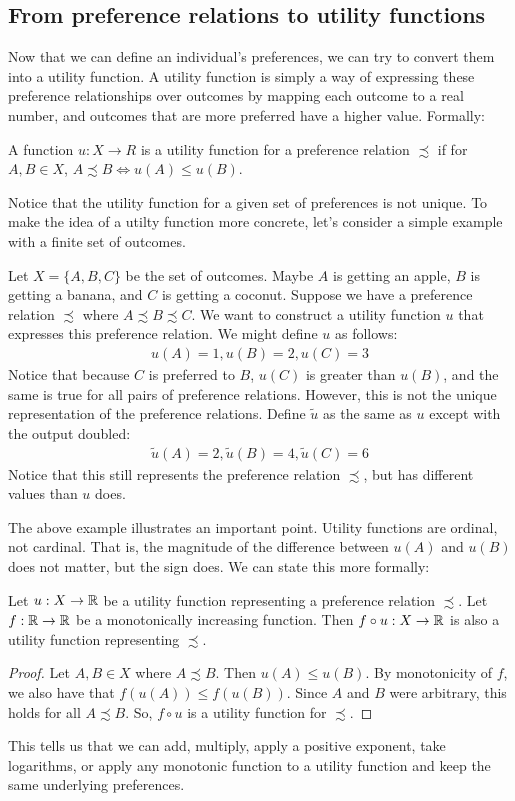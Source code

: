 \subsection*{From preference relations to utility functions}
Now that we can define an individual's preferences, we can try to convert them into a utility function. A utility function is simply a way of expressing these preference relationships over outcomes by mapping each outcome to a real number, and outcomes that are more preferred have a higher value. Formally:
\begin{definition*}
    A function $u: X \to R$ is a utility function for a preference relation $\precsim$ if for $A, B \in X$, $A \precsim B \iff u(A) \leq u(B)$. 
\end{definition*}
Notice that the utility function for a given set of preferences is not unique. To make the idea of a utilty function more concrete, let's consider a simple example with a finite set of outcomes.
\begin{example*}
    Let $X = \{A, B, C\}$ be the set of outcomes. Maybe $A$ is getting an apple, $B$ is getting a banana, and $C$ is getting a coconut. Suppose we have a preference relation $\precsim$ where $A \precsim B \precsim C$. We want to construct a utility function $u$ that expresses this preference relation. We might define $u$ as follows:
    \begin{align*}
        u(A) = 1, u(B) = 2, u(C) = 3
    \end{align*}
    Notice that because $C$ is preferred to $B$, $u(C)$ is greater than $u(B)$, and the same is true for all pairs of preference relations. However, this is not the unique representation of the preference relations. Define $\tilde{u}$ as the same as $u$ except with the output doubled:
    \begin{align*}
        \tilde{u}(A) = 2, \tilde{u}(B) = 4, \tilde{u}(C) = 6
    \end{align*}
    Notice that this still represents the preference relation $\precsim$, but has different values than $u$ does. 
\end{example*}
The above example illustrates an important point. Utility functions are ordinal, not cardinal. That is, the magnitude of the difference between $u(A)$ and $u(B)$ does not matter, but the sign does. We can state this more formally:

\begin{proposition*}
    Let $u : X \to \mathbb{R}$ be a utility function representing a preference relation $\precsim$. Let $f : \mathbb{R} \to \mathbb{R}$ be a monotonically increasing function. Then $f \circ u: X \to \mathbb{R}$ is also a utility function representing $\precsim$. 
\end{proposition*}
\begin{proof}
    Let $A, B \in X$ where $A \precsim B$. Then $u(A) \leq u(B)$. By monotonicity of $f$, we also have that $f(u(A)) \leq f(u(B))$. Since $A$ and $B$ were arbitrary, this holds for all $A \precsim B$. So, $f \circ u$ is a utility function for $\precsim$. 
\end{proof}
This tells us that we can add, multiply, apply a positive exponent, take logarithms, or apply any monotonic function to a utility function and keep the same underlying preferences. 

